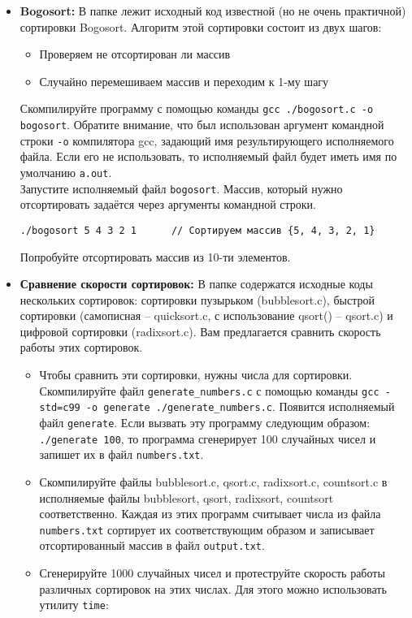 \documentclass{article}
\begin{document}
\begin{itemize}
\item \textbf{Bogosort:} В папке  лежит исходный код известной (но не очень практичной) сортировки Bogosort. Алгоритм этой сортировки состоит из двух шагов:
\begin{itemize}
\item Проверяем не отсортирован ли массив
\item Случайно перемешиваем массив и переходим к 1-му шагу
\end{itemize}
Скомпилируйте программу с помощью команды \texttt{gcc ./bogosort.c -o bogosort}. Обратите внимание, что был использован аргумент командной строки \texttt{-o} компилятора gcc, задающий имя результирующего исполняемого файла. Если его не использовать, то исполняемый файл будет иметь имя по умолчанию \texttt{a.out}.\\
Запустите исполняемый файл \texttt{bogosort}. Массив, который нужно отсортировать задаётся через аргументы командной строки.
\begin{lstlisting}
./bogosort 5 4 3 2 1      // Сортируем массив {5, 4, 3, 2, 1}
\end{lstlisting}
Попробуйте отсортировать массив из 10-ти элементов.
\item \textbf{Сравнение скорости сортировок:} В папке  содержатся исходные коды нескольких сортировок: сортировки пузырьком (bubblesort.c), быстрой сортировки (самописная -- quicksort.c, с использование qsort() -- qsort.c) и цифровой сортировки (radixsort.c). Вам предлагается сравнить скорость работы этих сортировок.
\begin{itemize}
\item Чтобы сравнить эти сортировки, нужны числа для сортировки. Скомпилируйте файл \texttt{generate\_numbers.c} с помощью команды \texttt{gcc -std=c99 -o generate ./generate\_numbers.c}. Появится исполняемый файл \texttt{generate}. Если вызвать эту программу следующим образом: \texttt{./generate 100}, то программа сгенерирует 100 случайных чисел и запишет их в файл \texttt{numbers.txt}.
\item Скомпилируйте файлы bubblesort.c,  qsort.c, radixsort.c, countsort.c в исполняемые файлы bubblesort, qsort, radixsort, countsort соответственно. Каждая из этих программ считывает числа из файла \texttt{numbers.txt} сортирует их соответствующим образом и записывает отсортированный массив в файл \texttt{output.txt}.
\item Сгенерируйте 1000 случайных чисел и протеструйте скорость работы различных сортировок на этих числах. Для этого можно использовать утилиту \texttt{time}:

\end{itemize}
\end{itemize}
\end{document}
